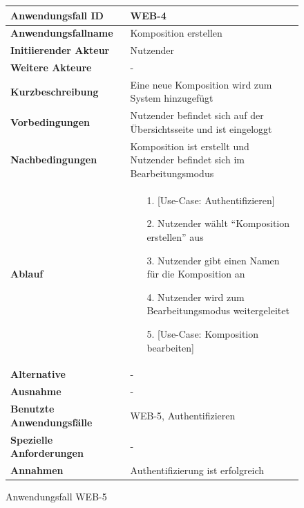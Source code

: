 \begin{figure}[h]
	\centering
	\begin{tabularx}{\textwidth}{ X | X }
		\textbf{Anwendungsfall ID} & WEB-4 \\ \hline
		\textbf{Anwendungsfallname} & Komposition erstellen \\ \hline
		\textbf{Initiierender Akteur} & Nutzender \\ \hline
		\textbf{Weitere Akteure} & - \\ \hline
		\textbf{Kurzbeschreibung} & Eine neue Komposition wird zum System hinzugefügt \\ \hline
		\textbf{Vorbedingungen} & Nutzender befindet sich auf der Übersichtsseite und ist eingeloggt  \\ \hline
		\textbf{Nachbedingungen} & Komposition ist erstellt und Nutzender befindet sich im Bearbeitungsmodus \\ \hline
		\textbf{Ablauf} &
		\begin{enumerate}
			\item[1.]  [Use-Case: Authentifizieren]
			\item[2.]  Nutzender wählt ``Komposition erstellen'' aus
			\item[3.]  Nutzender gibt einen Namen für die Komposition an
			\item[4.]  Nutzender wird zum Bearbeitungsmodus weitergeleitet
			\item[5.] [Use-Case: Komposition bearbeiten]
		\end{enumerate} \\ \hline
		\textbf{Alternative} & - \\ \hline
		\textbf{Ausnahme} & - \\ \hline
		\textbf{Benutzte Anwendungsfälle} & WEB-5, Authentifizieren\\ \hline
		\textbf{Spezielle Anforderungen} & - \\ \hline
		\textbf{Annahmen} & Authentifizierung ist erfolgreich
	\end{tabularx}
	\caption{Anwendungsfall WEB-5}
	\label{fig:anwendungsfall-server-tabelle-web-4}
\end{figure}


